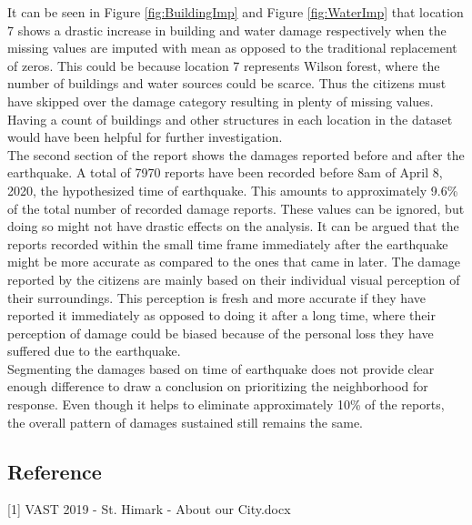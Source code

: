 \documentclass[12pt]{extarticle}
\begin{document}
It can be seen in Figure \ref{fig:BuildingImp} and Figure \ref{fig:WaterImp} that location 7 shows a drastic increase in building and water damage respectively when the missing values are imputed with mean as opposed to the traditional replacement of zeros. This could be because location 7 represents Wilson forest, where the number of buildings and water sources could be scarce. Thus the citizens must have skipped over the damage category resulting in plenty of missing values. Having a count of buildings and other structures in each location in the dataset would have been helpful for further investigation. \\ 

The second section of the report shows the damages reported before and after the earthquake. A total of 7970 reports have been recorded before 8am of April 8, 2020, the hypothesized time of earthquake. This amounts to approximately 9.6\% of the total number of recorded damage reports. These values can be ignored, but doing so might not have drastic effects on the analysis. 
It can be argued that the reports recorded within the small time frame immediately after the earthquake might be more accurate as compared to the ones that came in later. The damage reported by the citizens are mainly based on their individual visual perception of their surroundings. This perception is fresh and more accurate if they have reported it immediately as opposed to doing it after a long time, where their perception of damage could be biased because of the personal loss they have suffered due to the earthquake. \\

Segmenting the damages based on time of earthquake does not provide clear enough difference to draw a conclusion on prioritizing the neighborhood for response. Even though it helps to eliminate approximately 10\% of the reports, the overall pattern of damages sustained still remains the same. 


\begin{centering}
	\section{Reference}
\end{centering}
[1] VAST 2019 - St. Himark -  About our City.docx
\end{document}
